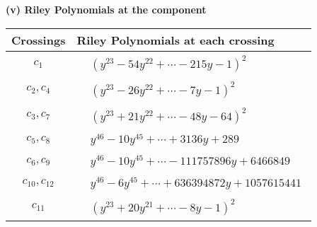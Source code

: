 \documentclass[1p]{elsarticle_modified}
\theoremstyle{definition}
\begin{document}
\newpage\renewcommand{\arraystretch}{1}
\flushleft \textbf{(v) Riley Polynomials at the component}\newline \\
\begin{tabular}{m{50pt}|m{274pt}}
Crossings & \hspace{64pt}Riley Polynomials at each crossing \\
\hline $$\begin{aligned}c_{1}\end{aligned}$$&$\begin{aligned}
&(y^{23}-54 y^{22}+\cdots-215 y-1)^{2}
\end{aligned}$\\
\hline $$\begin{aligned}c_{2},c_{4}\end{aligned}$$&$\begin{aligned}
&(y^{23}-26 y^{22}+\cdots-7 y-1)^{2}
\end{aligned}$\\
\hline $$\begin{aligned}c_{3},c_{7}\end{aligned}$$&$\begin{aligned}
&(y^{23}+21 y^{22}+\cdots-48 y-64)^{2}
\end{aligned}$\\
\hline $$\begin{aligned}c_{5},c_{8}\end{aligned}$$&$\begin{aligned}
&y^{46}-10 y^{45}+\cdots+3136 y+289
\end{aligned}$\\
\hline $$\begin{aligned}c_{6},c_{9}\end{aligned}$$&$\begin{aligned}
&y^{46}-10 y^{45}+\cdots-111757896 y+6466849
\end{aligned}$\\
\hline $$\begin{aligned}c_{10},c_{12}\end{aligned}$$&$\begin{aligned}
&y^{46}-6 y^{45}+\cdots+636394872 y+1057615441
\end{aligned}$\\
\hline $$\begin{aligned}c_{11}\end{aligned}$$&$\begin{aligned}
&(y^{23}+20 y^{21}+\cdots-8 y-1)^{2}
\end{aligned}$\\
\hline
\end{tabular}\\~\\
\end{document}
